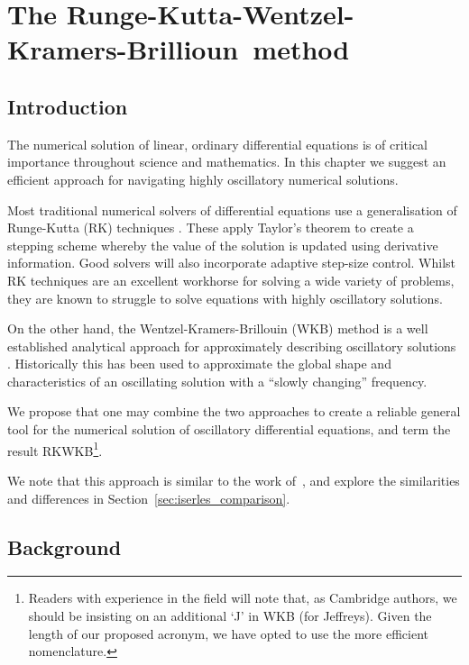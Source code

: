 \chapter[The RKWKB method]{The Runge-Kutta-Wentzel-Kramers-Brillioun~method}
\label{chp:RK}

\section{Introduction}
\label{sec:introduction}
The numerical solution of linear, ordinary differential equations is of critical importance throughout science and mathematics. In this chapter we suggest an efficient approach for navigating highly oscillatory numerical solutions.

Most traditional numerical solvers of differential equations use a generalisation of Runge-Kutta (RK) techniques \citep{Press+2007}. These apply Taylor's theorem to create a stepping scheme whereby the value of the solution is updated using derivative information. Good solvers will also incorporate adaptive step-size control.
Whilst RK techniques are an excellent workhorse for solving a wide variety of problems, they are known to struggle to solve equations with highly oscillatory solutions.

On the other hand, the Wentzel-Kramers-Brillouin (WKB) method is a well established analytical approach for approximately describing oscillatory solutions \citep{RHB,Bender+2010}. Historically this has been used to approximate the global shape and characteristics of an oscillating solution with a ``slowly changing'' frequency.

We propose that one may combine the two approaches to create a reliable general tool for the numerical solution of oscillatory differential equations, and term the result RKWKB\footnote{Readers with experience in the field will note that, as Cambridge authors, we should be insisting on an additional `J' in WKB (for Jeffreys). Given the length of our proposed acronym, we have opted to use the more efficient nomenclature.}.

We note that this approach is similar to the work of~\cite{Iserles02globalerror,Iserles01thinkglobally}, and explore the similarities and differences in Section~\ref{sec:iserles_comparison}.


\section{Background}
